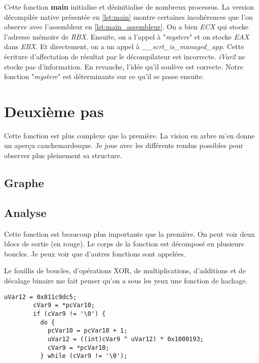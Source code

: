\documentclass{rapport}
\begin{document}
\hspace{18pt}Cette fonction \textbf{main} initialise et désinitialise de nombreux processus. La version décompilée native présentée en \ref{lst:main} montre certaines incohérences que l'on observe avec l'assembleur en \ref{lst:main_assembleur}. On a bien \textit{ECX} qui stocke l'adresse mémoire de \textit{RBX}. Ensuite, on a l'appel à "\textit{mystere}" et on stocke \textit{EAX} dans \textit{EBX}. Et directement, on a un appel à \textit{\_\_scrt\_is\_managed\_app}. Cette écriture d'affectation de résultat par le décompilateur est incorrecte. \textit{iVar2} ne stocke pas d'information. En revanche, l'idée qu'il soulève est correcte. Notre fonction "\textit{mystere}" est déterminante sur ce qu'il se passe ensuite.

\section{Deuxième pas}

Cette fonction est plus complexe que la première. La vision en arbre m'en donne un aperçu cauchemardesque. Je joue avec les différents rendus possibles pour observer plus pleinement sa structure.

\subsection{Graphe}

\subsection{Analyse}

\hspace{18pt}Cette fonction est beaucoup plus importante que la première. On peut voir deux blocs de sortie (en rouge). Le corps de la fonction est décomposé en plusieurs boucles. Je peux voir que d'autres fonctions sont appelées. 

Le fouillis de boucles, d'opérations XOR, de multiplications, d'additions et de décalage binaire me fait penser qu'on a sous les yeux une fonction de hachage.

\begin{lstlisting}[caption={mystère-extrait}, label={lst:mystere_boucle}]
        uVar12 = 0x811c9dc5;
        cVar9 = *pcVar10;
        if (cVar9 != '\0') {
          do {
            pcVar10 = pcVar10 + 1;
            uVar12 = ((int)cVar9 ^ uVar12) * 0x1000193;
            cVar9 = *pcVar10;
          } while (cVar9 != '\0');
\end{lstlisting}
\end{document}
